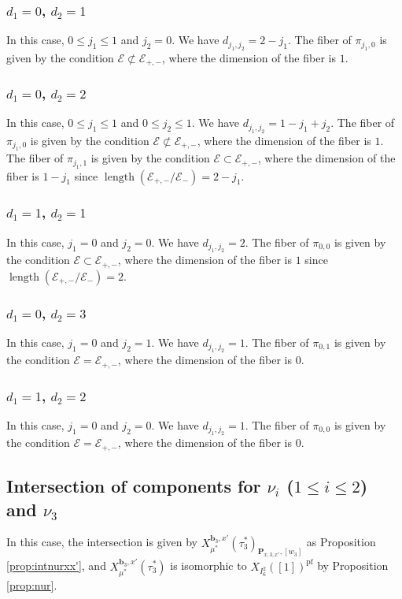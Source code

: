 \documentclass[12pt,a4paper]{article}
\DeclareMathOperator{\length}{length}
\newcommand{\bfP}{\mathbf{P}}
\newcommand{\bfb}{\mathbf{b}}
\newcommand{\cE}{\mathcal{E}}
\begin{document}
\subsubsection{$d_1=0$, $d_2=1$}
In this case, $0 \leq j_1 \leq 1$ and $j_2=0$. 
We have $d_{j_1,j_2}=2-j_1$. 
The fiber of $\pi_{j_1,0}$ is given by the condition 
$\cE \not\subset \cE_{+,-}$, where
the dimension of the fiber is $1$. 

\subsubsection{$d_1=0$, $d_2=2$}
In this case, $0 \leq j_1 \leq 1$ and $0 \leq j_2 \leq 1$. 
We have $d_{j_1,j_2}=1-j_1+j_2$. 
The fiber of $\pi_{j_1,0}$ is given by the condition 
$\cE \not\subset \cE_{+,-}$, where
the dimension of the fiber is $1$. 
The fiber of $\pi_{j_1,1}$ is given by the condition 
$\cE \subset \cE_{+,-}$, where 
the dimension of the fiber is $1-j_1$ since 
$\length (\cE_{+,-}/\cE_-)=2-j_1$. 

\subsubsection{$d_1=1$, $d_2=1$} 
In this case, $j_1=0$ and $j_2=0$. 
We have $d_{j_1,j_2}=2$. 
The fiber of $\pi_{0,0}$ is given by the condition 
$\cE \subset \cE_{+,-}$, where 
the dimension of the fiber is $1$ since 
$\length (\cE_{+,-}/\cE_-)=2$. 

\subsubsection{$d_1=0$, $d_2=3$}
In this case, $j_1 =0$ and $j_2 = 1$. 
We have $d_{j_1,j_2}=1$. 
The fiber of $\pi_{0,1}$ is given by the condition 
$\cE = \cE_{+,-}$, where 
the dimension of the fiber is $0$. 

\subsubsection{$d_1=1$, $d_2=2$}
In this case, $j_1=0$ and $j_2=0$. 
We have $d_{j_1,j_2}=1$. 
The fiber of $\pi_{0,0}$ is given by the condition 
$\cE = \cE_{+,-}$, where 
the dimension of the fiber is $0$. 

\subsection{Intersection of components for $\nu_i$ ($1 \leq i \leq 2$) and $\nu_3$}
In this case, the intersection is given by $X_{\mu^*}^{\bfb_3,x'}(\tau_3^*)_{\bfP_{x,3,x'},[w_3]}$ as Proposition \ref{prop:intnurxx'}, and 
$X_{\mu^*}^{\bfb_3,x'}(\tau_3^*)$ is isomorphic to $X_{I_{6}^{2}}([1])^{\mathrm{pf}}$ by Proposition \ref{prop:nur}. 
\end{document}
